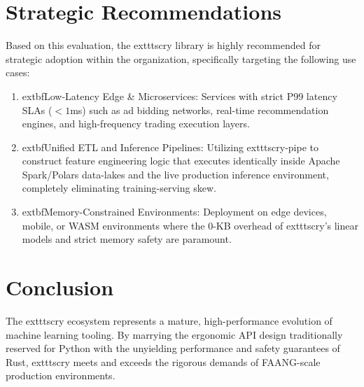 \documentclass[11pt, a4paper]{article}
\begin{document}
\section{Strategic Recommendations}

Based on this evaluation, the 	exttt{scry} library is highly recommended for strategic adoption within the organization, specifically targeting the following use cases:

\begin{enumerate}
    \item 	extbf{Low-Latency Edge \& Microservices:} Services with strict P99 latency SLAs ($< 1$ms) such as ad bidding networks, real-time recommendation engines, and high-frequency trading execution layers. 
    \item 	extbf{Unified ETL and Inference Pipelines:} Utilizing 	exttt{scry-pipe} to construct feature engineering logic that executes identically inside Apache Spark/Polars data-lakes and the live production inference environment, completely eliminating training-serving skew.
    \item 	extbf{Memory-Constrained Environments:} Deployment on edge devices, mobile, or WASM environments where the 0-KB overhead of 	exttt{scry}'s linear models and strict memory safety are paramount.
\end{enumerate}

\section{Conclusion}
The 	exttt{scry} ecosystem represents a mature, high-performance evolution of machine learning tooling. By marrying the ergonomic API design traditionally reserved for Python with the unyielding performance and safety guarantees of Rust, 	exttt{scry} meets and exceeds the rigorous demands of FAANG-scale production environments.
\end{document}
